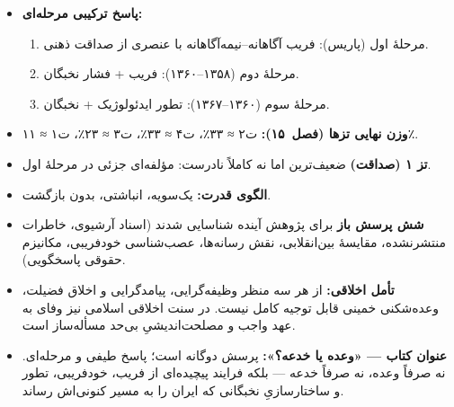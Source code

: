 \documentclass[12pt,a4paper]{book}
\begin{document}

\begin{principleBox}
\begin{itemize}
\item \textbf{پاسخ ترکیبی مرحله‌ای:}
  \begin{enumerate}[nosep]
    \item مرحلهٔ اول (پاریس):
      \textcolor{cAccent}{فریب آگاهانه–نیمه‌آگاهانه}
      با عنصری از صداقت ذهنی.
    \item مرحلهٔ دوم (۱۳۵۸–۱۳۶۰):
      \textcolor{cAccent}{فریب} + \textcolor{cConsolid}{فشار نخبگان}.
    \item مرحلهٔ سوم (۱۳۶۰–۱۳۶۷):
      \textcolor{cGold}{تطور ایدئولوژیک} + \textcolor{cConsolid}{نخبگان}.
  \end{enumerate}

\item \textbf{وزن نهایی تزها (فصل~۱۵):}
  \textcolor{cAccent}{ت‌۲ ≈ ۳۳٪}،
  \textcolor{cConsolid}{ت‌۴ ≈ ۳۳٪}،
  \textcolor{cGold}{ت‌۳ ≈ ۲۳٪}،
  \textcolor{cGreen}{ت‌۱ ≈ ۱۱٪}.

\item \textbf{تز ۱ (صداقت)} ضعیف‌ترین اما نه کاملاً نادرست:
  مؤلفه‌ای جزئی در مرحلهٔ اول.

\item \textbf{الگوی قدرت:} یک‌سویه، انباشتی، بدون بازگشت.

\item \textbf{شش پرسش باز} برای پژوهش آینده شناسایی شدند
  (اسناد آرشیوی، خاطرات منتشرنشده، مقایسهٔ بین‌انقلابی،
  نقش رسانه‌ها، عصب‌شناسی خودفریبی، مکانیزم حقوقی پاسخگویی).

\item \textbf{تأمل اخلاقی:}
  از هر سه منظر وظیفه‌گرایی، پیامدگرایی و اخلاق فضیلت،
  وعده‌شکنی خمینی قابل توجیه کامل نیست.
  در سنت اخلاقی اسلامی نیز
  وفای به عهد واجب و مصلحت‌اندیشیِ بی‌حد مسأله‌ساز است.

\item \textbf{عنوان کتاب — «وعده یا خدعه؟»:}
  پرسش دوگانه است؛ پاسخ طیفی و مرحله‌ای.
  نه صرفاً وعده، نه صرفاً خدعه —
  بلکه فرایند پیچیده‌ای از فریب، خودفریبی،
  تطور و ساختارسازیِ نخبگانی
  که ایران را به مسیر کنونی‌اش رساند.
\end{itemize}
\end{principleBox}

\appendix
\renewcommand{\chaptername}{پیوست}
\end{document}
